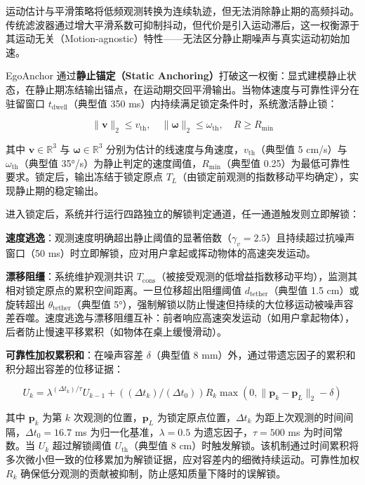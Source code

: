 \documentclass[review]{vgtc}
\begin{document}
运动估计与平滑策略将低频观测转换为连续轨迹，但无法消除静止期的高频抖动。传统滤波器通过增大平滑系数可抑制抖动，但代价是引入运动滞后，这一权衡源于其运动无关（Motion-agnostic）特性------无法区分静止期噪声与真实运动初始加速。

EgoAnchor 通过\textbf{静止锚定（Static Anchoring）}打破这一权衡：显式建模静止状态，在静止期冻结输出锚点，在运动期交回平滑输出。当物体速度与可靠性评分在驻留窗口 $t_{\mathrm{dwell}}$（典型值 350 ms）内持续满足锁定条件时，系统激活静止锁：

\begin{equation}
\lVert \mathbf{v} \rVert_2 \leq v_{\mathrm{th}}, \quad \lVert \mathbf{\omega} \rVert_2 \leq \omega_{\mathrm{th}}, \quad R \geq R_{\mathrm{min}}
\label{eq:lock-condition}
\end{equation}


其中 $\mathbf{v} \in \mathbb{R}^3$ 与 $\mathbf{\omega} \in \mathbb{R}^3$ 分别为估计的线速度与角速度，$v_{\mathrm{th}}$（典型值 5 cm/s）与 $\omega_{\mathrm{th}}$（典型值 35°/s）为静止判定的速度阈值，$R_{\mathrm{min}}$（典型值 0.25）为最低可靠性要求。锁定后，输出冻结于锁定原点 $T_L$（由锁定前观测的指数移动平均确定），实现静止期的稳定输出。

进入锁定后，系统并行运行四路独立的解锁判定通道，任一通道触发则立即解锁：

\textbf{速度逃逸}：观测速度明确超出静止阈值的显著倍数（$\gamma_v = 2.5$）且持续超过抗噪声窗口（50 ms）时立即解锁，应对用户拿起或挥动物体的高速突发运动。

\textbf{漂移阻缰}：系统维护观测共识 $T_{\mathrm{cons}}$（被接受观测的低增益指数移动平均），监测其相对锁定原点的累积空间距离。一旦位移超出阻缰阈值 $d_{\mathrm{tether}}$（典型值 1.5 cm）或旋转超出 $\theta_{\mathrm{tether}}$（典型值 5°），强制解锁以防止慢速但持续的大位移运动被噪声容差吞噬。速度逃逸与漂移阻缰互补：前者响应高速突发运动（如用户拿起物体），后者防止慢速平移累积（如物体在桌上缓慢滑动）。

\textbf{可靠性加权累积和}：在噪声容差 $\delta$（典型值 8 mm）外，通过带遗忘因子的累积和积分超出容差的位移证据：

\begin{equation}
U_k = \lambda^{(\Delta t_k) / \tau} U_{k-1} + ((\Delta t_k) / (\Delta t_0)) R_k \max\!\left(0, \lVert \mathbf{p}_k - \mathbf{p}_L \rVert_2 - \delta\right)
\label{eq:cusum}
\end{equation}


其中 $\mathbf{p}_k$ 为第 $k$ 次观测的位置，$\mathbf{p}_L$ 为锁定原点位置，$\Delta t_k$ 为距上次观测的时间间隔，$\Delta t_0 = 16.7$ ms 为归一化基准，$\lambda = 0.5$ 为遗忘因子，$\tau = 500$ ms 为时间常数。当 $U_k$ 超过解锁阈值 $U_{\mathrm{th}}$（典型值 8 cm）时触发解锁。该机制通过时间累积将多次微小但一致的位移累加为解锁证据，应对容差内的细微持续运动。可靠性加权 $R_k$ 确保低分观测的贡献被抑制，防止感知质量下降时的误解锁。
\end{document}

